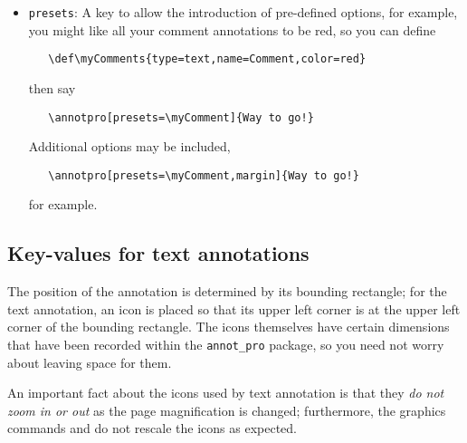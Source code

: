 \documentclass[12pt]{article}
\begin{document}
\begin{itemize}
  \item \texttt{presets}: A key to allow the introduction of pre-defined options, for example,
    you might like all your comment annotations to be red, so you can define
\begin{verbatim}
   \def\myComments{type=text,name=Comment,color=red}
\end{verbatim}
then say
\begin{verbatim}
   \annotpro[presets=\myComment]{Way to go!}
\end{verbatim}
Additional options may be included,
\begin{verbatim}
   \annotpro[presets=\myComment,margin]{Way to go!}
\end{verbatim}
for example.

\end{itemize}

\subsection{Key-values for text annotations}

The position of the annotation is determined by its bounding rectangle; for the
text annotation, an icon is placed so that its upper left corner is at the upper
left corner of the bounding rectangle. The icons themselves have certain dimensions
that have been recorded within the \texttt{annot\_pro} package, so you need not worry
about leaving space for them.

An important fact about the icons used by text annotation is that they \emph{do not zoom in or out} as the page
magnification is changed; furthermore, the graphics commands  and  do not rescale
the icons as expected.
\end{document}
